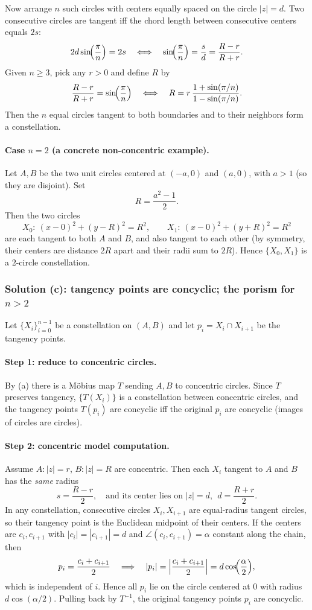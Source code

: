 \documentclass[12pt,a4paper]{article}
\theoremstyle{plain}
\theoremstyle{definition}      %
\begin{document}
Now arrange $n$ such circles with centers equally spaced on the circle $|z|=d$.
Two consecutive circles are tangent iff the chord length between consecutive centers equals $2s$:
\[
2d\sin\!\Bigl(\frac{\pi}{n}\Bigr)=2s
\quad\Longleftrightarrow\quad
\sin\!\Bigl(\frac{\pi}{n}\Bigr)=\frac{s}{d}=\frac{R-r}{R+r}.
\]
Given $n\ge 3$, pick any $r>0$ and define $R$ by
\[
\frac{R-r}{R+r}=\sin\!\Bigl(\frac{\pi}{n}\Bigr)
\quad\Longleftrightarrow\quad
R=r\,\frac{1+\sin(\pi/n)}{1-\sin(\pi/n)}.
\]
Then the $n$ equal circles tangent to both boundaries and to their neighbors form a constellation.

\paragraph{Case $n=2$ (a concrete non-concentric example).}
Let $A,B$ be the two unit circles centered at $(-a,0)$ and $(a,0)$, with $a>1$ (so they are disjoint).
Set
\[
R=\frac{a^2-1}{2}.
\]
Then the two circles
\[
X_0:\ (x-0)^2+(y-R)^2=R^2,
\qquad
X_1:\ (x-0)^2+(y+R)^2=R^2
\]
are each tangent to both $A$ and $B$, and also tangent to each other (by symmetry, their centers are distance $2R$ apart
and their radii sum to $2R$). Hence $\{X_0,X_1\}$ is a $2$-circle constellation.

\subsubsection*{Solution (c): tangency points are concyclic; the porism for $n>2$}
Let $\{X_i\}_{i=0}^{n-1}$ be a constellation on $(A,B)$ and let $p_i=X_i\cap X_{i+1}$ be the tangency points.

\paragraph{Step 1: reduce to concentric circles.}
By (a) there is a M\"obius map $T$ sending $A,B$ to concentric circles.
Since $T$ preserves tangency, $\{T(X_i)\}$ is a constellation between concentric circles, and the tangency points
$T(p_i)$ are concyclic iff the original $p_i$ are concyclic (images of circles are circles).

\paragraph{Step 2: concentric model computation.}
Assume $A:|z|=r$, $B:|z|=R$ are concentric. Then each $X_i$ tangent to $A$ and $B$ has the \emph{same} radius
\[
s=\frac{R-r}{2},
\quad\text{and its center lies on } |z|=d,\ \ d=\frac{R+r}{2}.
\]
In any constellation, consecutive circles $X_i,X_{i+1}$ are equal-radius tangent circles, so their tangency point is the
Euclidean midpoint of their centers. If the centers are $c_i,c_{i+1}$ with $|c_i|=|c_{i+1}|=d$ and
$\angle(c_i,c_{i+1})=\alpha$ constant along the chain, then
\[
p_i=\frac{c_i+c_{i+1}}{2}
\quad\Longrightarrow\quad
|p_i|=\Bigl|\frac{c_i+c_{i+1}}{2}\Bigr|=d\cos\!\Bigl(\frac{\alpha}{2}\Bigr),
\]
which is independent of $i$. Hence all $p_i$ lie on the circle centered at $0$ with radius $d\cos(\alpha/2)$.
Pulling back by $T^{-1}$, the original tangency points $p_i$ are concyclic.
\end{document}
